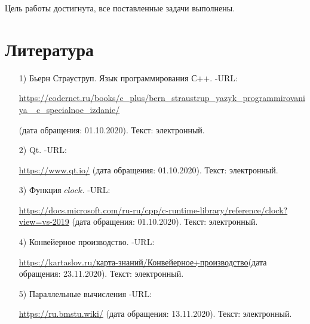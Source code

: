 \documentclass[14pt, a4paper]{extarticle}
\begin{document}
	Цель работы достигнута, все поставленные задачи выполнены.
	
	
	\newpage	
	\section*{Литература}
		
	\begin{enumerate}
		\label{CPlusPlus}
		\item[1)] Бьерн Страуструп. Язык программирования С++. -URL:\par 
		\href{https://codernet.ru/books/c_plus/bern_straustrup_yazyk_programmirovaniya_c_specialnoe_izdanie/}
		{https://codernet.ru/books/c\_plus/bern\_straustrup\_yazyk\_programmirovaniya\_
			c\_specialnoe\_izdanie/}\par(дата обращения:
		01.10.2020). Текст: электронный.
		
		\label{Cute}
		\item[2)] Qt. -URL:\par
		\href{https://www.qt.io/}{https://www.qt.io/} (дата обращения: 01.10.2020). Текст: электронный.
		
		\label{CLOCK}
		\item[3)] Функция $clock$. -URL:\par
		\href{https://docs.microsoft.com/ru-ru/cpp/c-runtime-library/reference/clock?view=vs-2019}{https://docs.microsoft.com/ru-ru/cpp/c-runtime-library/reference/clock?view=vs-2019} (дата обращения:
		01.10.2020). Текст: электронный.
		
		\label{Conveyer}
		\item[4)] Конвейерное производство. -URL:\par \href{https://kartaslov.ru/карта-знаний/Конвейерное+производство}{https://kartaslov.ru/карта-знаний/Конвейерное+производство}\newline (дата обращения: 23.11.2020). Текст: электронный.
		
		
		
		\label{ParInfo}
		\item[5)] Параллельные вычисления -URL:\par
		\href{https://ru.bmstu.wiki/}{https://ru.bmstu.wiki/} (дата обращения:
		13.11.2020). Текст: электронный.
		
	\end{enumerate}
\end{document}
